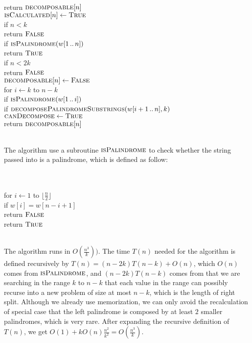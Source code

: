 \documentclass[11pt]{article}
\begin{document}
\begin{solution}
\begin{algo}
\\		return $\textsc{decomposable}[n]$\-
\\	$\textsc{isCalculated}[n] \gets \textsc{True}$
\\	if $n < k$\+
\\		return $\textsc{False}$\-
\\	if $\textsc{isPalindrome}(w[1\,..\,n])$\+
\\		return $\textsc{True}$\-
\\	if $n < 2k$\+
\\		return $\textsc{False}$\-
\\	$\textsc{decomposable}[n] \gets \textsc{False}$
\\	for $i\gets k$ to $n-k$\+
\\		if $\textsc{isPalindrome}(w[1\,..\,i])$\+
\\			if $\textsc{decomposePalindromeSubstrings}(w[i+1\,..\,n], k)$\+
\\				$\textsc{canDecompose} \gets \textsc{True}$\- \- \-
\\	return $\textsc{decomposable}[n]$
\\			
\\[0.5ex]
	
\end{algo}
The algorithm use a subroutine $\textsc{isPalindrome}$ to check whether the string passed into is a palindrome, which is defined as follow:

\begin{algo}
	\+
\\[0.5ex]
\\	for $i\gets 1$ to $\lfloor \frac{n}{2} \rfloor$\+
\\		if $w[i] = w[n-i+1]$\+
\\			return $\textsc{False}$\- \-
\\	return $\textsc{True}$
\\			
\\[0.5ex]
	
\end{algo}
The algorithm runs in $O(\frac{n^3}{k}))$. The time $T(n)$ needed for the algorithm is defined recursively by $T(n) = (n-2k) T(n-k) + O(n)$, which $O(n)$ comes from $\textsc{isPalindrome}$, and $(n-2k) T(n-k)$ comes from that we are searching in the range $k$ to $n-k$ that each value in the range can possibly recurse into a new problem of size at most $n-k$, which is the length of right split. Although we already use memorization, we can only avoid the recalculation of special case that the left palindrome is composed by at least $2$ smaller palindromes, which is very rare. After expanding the recursive definition of $T(n)$, we get $O(1) + k O(n) \frac{n^2}{k^2} = O(\frac{n^3}{k})$.
\end{solution}
\clearpage
\end{document}
